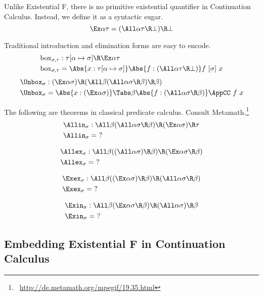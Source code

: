 \documentclass{amsart}
\begin{document}
Unlike Existential F, there is no primitive existential
quantifier in Continuation Calculus. Instead, we define it as a
syntactic sugar.
\[
\Ex\alpha \tau = (\All\alpha \tau \R \bot) \R \bot
\]

Traditional introduction and elimination forms are easy to
encode.
\begin{align*}
\Box_{\sigma,\tau} & :
  \tau[\alpha\mapsto\sigma] \R \Ex\alpha\tau
  \\
\Box_{\sigma,\tau} & =
  \Abs{x : \tau[\alpha\mapsto\sigma]}
  \Abs{f : (\All\alpha \tau \R \bot)}
  f~[\sigma]~x
\end{align*}
%
\begin{align*}
\Unbox_{\sigma} & :
  (\Ex\alpha\sigma) \R
  (\All\beta (\All\alpha \sigma \R \beta) \R \beta)
  \\
\Unbox_{\sigma} & =
  \Abs{x : (\Ex\alpha\sigma)}
  \Tabs\beta
  \Abs{f : (\All\alpha \sigma \R \beta)}
  \AppCC~f~x
\end{align*}

The following are theorems in classical predicate calculus.
Consult Metamath.\footnote{
~\url{http://de.metamath.org/mpegif/19.35.html}
}
\begin{align*}
\Allin_\sigma & : \All\beta
  (\All\alpha \sigma\R\beta) \R
  (\Ex\alpha \sigma) \R \tau
  \\
\Allin_\sigma & = ~?
\end{align*}

\begin{align*}
\Allex_\sigma & : \All\beta
  ((\All\alpha\sigma) \R \beta) \R
  (\Ex\alpha \sigma \R \beta)
  \\
\Allex_\sigma & = ~?
\end{align*}

\begin{align*}
\Exex_\sigma & : \All\beta
  ((\Ex\alpha \sigma) \R \beta) \R
  (\All\alpha \sigma \R \beta)
  \\
\Exex_\sigma & = ~?
\end{align*}

\begin{align*}
\Exin_\sigma & : \All\beta
  (\Ex\alpha \sigma \R \beta) \R
  (\All\alpha\sigma) \R \beta
  \\
\Exin_\sigma & = ~?
\end{align*}

\subsection{Embedding Existential F in Continuation Calculus}
\end{document}
